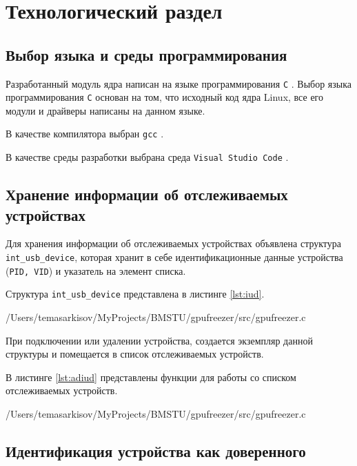 \chapter{Технологический раздел}

\section{Выбор языка и среды программирования}

Разработанный модуль ядра написан на языке программирования \texttt{C} \cite{c-language}. Выбор языка программирования \texttt{С} основан на том, что исходный код ядра Linux, все его модули и драйверы написаны на данном языке.

В качестве компилятора выбран \texttt{gcc} \cite{gcc}.

В качестве среды разработки выбрана среда \texttt{Visual Studio Code} \cite{vscode}.

\section{Хранение информации об отслеживаемых устройствах}

Для хранения информации об отслеживаемых устройствах объявлена структура \texttt{int\_usb\_device}, которая хранит в себе идентификационные данные устройства (\texttt{PID, VID}) и указатель на элемент списка.

Структура \texttt{int\_usb\_device} представлена в листинге \ref{lst:iud}.

\begin{lstinputlisting}[
	caption={Структура \texttt{int\_usb\_device}},
	label={lst:iud},
	style={c},
	linerange={9-14},
	]{/Users/temasarkisov/MyProjects/BMSTU/gpufreezer/src/gpufreezer.c}
\end{lstinputlisting}

При подключении или удалении устройства, создается экземпляр данной структуры и помещается в список отслеживаемых устройств.

\newpage
В листинге \ref{lst:adiud} представлены функции для работы со списком отслеживаемых устройств.

\begin{lstinputlisting}[
	caption={Функции для работы со списком отслеживаемых устройств},
	label={lst:adiud},
	style={c},
	linerange={83-104},
	]{/Users/temasarkisov/MyProjects/BMSTU/gpufreezer/src/gpufreezer.c}
\end{lstinputlisting}

\section{Идентификация устройства как доверенного}

